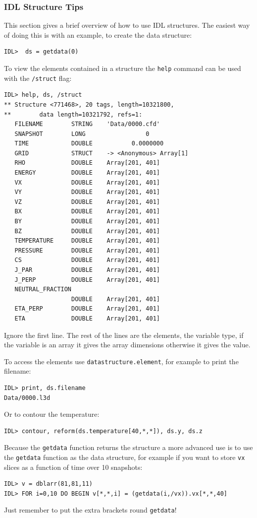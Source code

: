 \documentclass[11pt]{article}
\begin{document}
\subsubsection{IDL Structure Tips}
\label{IDLtips}
This section gives a brief overview of how to use IDL structures. The easiest way of doing this is with an example, to create the data structure:
\begin{verbatim}
IDL>  ds = getdata(0)
\end{verbatim}

To view the elements contained in a structure the \texttt{help} command can be used with the \texttt{/struct} flag:
\begin{verbatim}
IDL> help, ds, /struct
** Structure <771468>, 20 tags, length=10321800, 
**        data length=10321792, refs=1:
   FILENAME        STRING    'Data/0000.cfd'
   SNAPSHOT        LONG                 0
   TIME            DOUBLE           0.0000000
   GRID            STRUCT    -> <Anonymous> Array[1]
   RHO             DOUBLE    Array[201, 401]
   ENERGY          DOUBLE    Array[201, 401]
   VX              DOUBLE    Array[201, 401]
   VY              DOUBLE    Array[201, 401]
   VZ              DOUBLE    Array[201, 401]
   BX              DOUBLE    Array[201, 401]
   BY              DOUBLE    Array[201, 401]
   BZ              DOUBLE    Array[201, 401]
   TEMPERATURE     DOUBLE    Array[201, 401]
   PRESSURE        DOUBLE    Array[201, 401]
   CS              DOUBLE    Array[201, 401]
   J_PAR           DOUBLE    Array[201, 401]
   J_PERP          DOUBLE    Array[201, 401]
   NEUTRAL_FRACTION
                   DOUBLE    Array[201, 401]
   ETA_PERP        DOUBLE    Array[201, 401]
   ETA             DOUBLE    Array[201, 401]
\end{verbatim}
Ignore the first line. The rest of the lines are the elements, the variable type, if the variable is an array it gives the array dimensions otherwise it gives the value. 

To access the elements use \texttt{datastructure.element}, for example to print the filename:
\begin{verbatim}
IDL> print, ds.filename
Data/0000.l3d
\end{verbatim}

Or to contour the temperature:
\begin{verbatim}
IDL> contour, reform(ds.temperature[40,*,*]), ds.y, ds.z
\end{verbatim}

Because the \texttt{getdata} function returns the structure a more advanced use is to use the \texttt{getdata} function as the data structure, for example if you want to store \texttt{vx} slices as a function of time over 10 snapshots:
\begin{verbatim}
IDL> v = dblarr(81,81,11)
IDL> FOR i=0,10 DO BEGIN v[*,*,i] = (getdata(i,/vx)).vx[*,*,40]
\end{verbatim}
Just remember to put the extra brackets round \texttt{getdata}!
\end{document}
